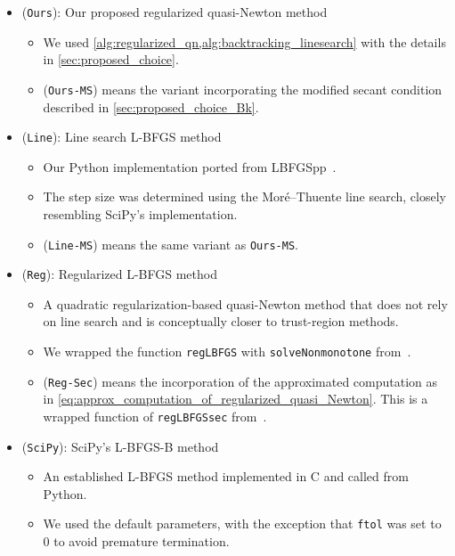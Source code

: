 \documentclass[journal]{subfiles}
\begin{document}
\begin{itemize}
    \item (\texttt{Ours}): Our proposed regularized quasi-Newton method
          \begin{itemize}
              \item We used \cref{alg:regularized_qn,alg:backtracking_linesearch} with the details in \cref{sec:proposed_choice}.
              \item (\texttt{Ours-MS}) means the variant incorporating the modified secant condition described in \cref{sec:proposed_choice_Bk}.
          \end{itemize}

    \item (\texttt{Line}): Line search L-BFGS method
          \begin{itemize}
              \item Our Python implementation ported from LBFGSpp~\citep{Okazaki2007libLBFGS}.
              \item The step size was determined using the Mor\'e--Thuente line search, closely resembling SciPy's implementation.
              \item (\texttt{Line-MS}) means the same variant as \texttt{Ours-MS}.
          \end{itemize}

    \item (\texttt{Reg}): Regularized L-BFGS method~\citep{kanzowRegularizationLimitedMemory2023}
          \begin{itemize}
              \item A quadratic regularization-based quasi-Newton method that does not rely on line search and is conceptually closer to trust-region methods.
              \item We wrapped the function \texttt{regLBFGS} with \texttt{solveNonmonotone} from~\citep{kanzowRegularizationLimitedMemory2023}.
              \item (\texttt{Reg-Sec}) means the incorporation of the approximated computation as in \cref{eq:approx_computation_of_regularized_quasi_Newton}. This is a wrapped function of \texttt{regLBFGSsec} from~\citep{kanzowRegularizationLimitedMemory2023}.
          \end{itemize}

    \item (\texttt{SciPy}): SciPy's L-BFGS-B method~\citep{2020SciPy-NMeth}
          \begin{itemize}
              \item An established L-BFGS method implemented in C and called from Python.
              \item We used the default parameters, with the exception that \texttt{ftol} was set to $0$ to avoid premature termination.
          \end{itemize}


\end{itemize}
\end{document}
